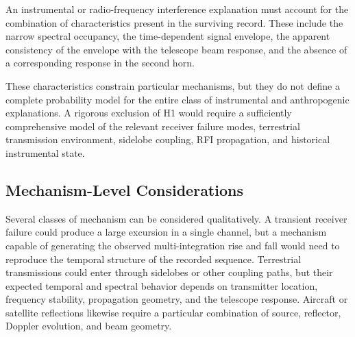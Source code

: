 \documentclass[twocolumn]{aastex701}
\begin{document}
An instrumental or radio-frequency interference explanation must account for the combination of characteristics present in the surviving record. These include the narrow spectral occupancy, the time-dependent signal envelope, the apparent consistency of the envelope with the telescope beam response, and the absence of a corresponding response in the second horn.

These characteristics constrain particular mechanisms, but they do not define a complete probability model for the entire class of instrumental and anthropogenic explanations. A rigorous exclusion of H1 would require a sufficiently comprehensive model of the relevant receiver failure modes, terrestrial transmission environment, sidelobe coupling, RFI propagation, and historical instrumental state.

\subsection{Mechanism-Level Considerations}

Several classes of mechanism can be considered qualitatively. A transient receiver failure could produce a large excursion in a single channel, but a mechanism capable of generating the observed multi-integration rise and fall would need to reproduce the temporal structure of the recorded sequence. Terrestrial transmissions could enter through sidelobes or other coupling paths, but their expected temporal and spectral behavior depends on transmitter location, frequency stability, propagation geometry, and the telescope response. Aircraft or satellite reflections likewise require a particular combination of source, reflector, Doppler evolution, and beam geometry.
\end{document}
